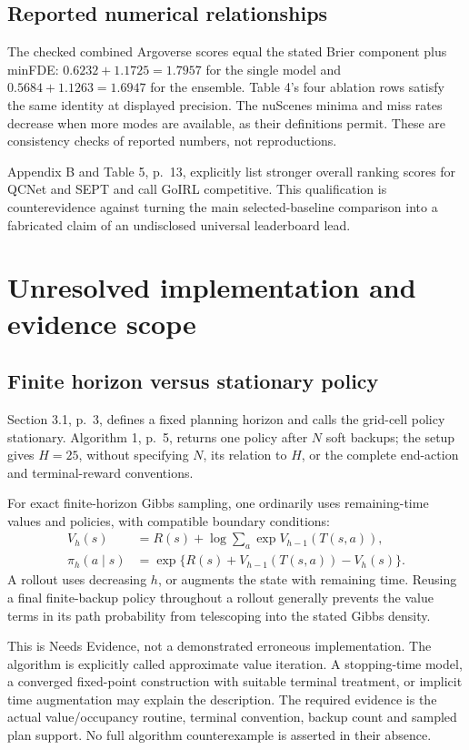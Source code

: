 \documentclass[10pt]{article}
\begin{document}
\subsection*{Reported numerical relationships}
The checked combined Argoverse scores equal the stated Brier component plus minFDE: \(0.6232+1.1725=1.7957\) for the single model and \(0.5684+1.1263=1.6947\) for the ensemble. Table 4’s four ablation rows satisfy the same identity at displayed precision. The nuScenes minima and miss rates decrease when more modes are available, as their definitions permit. These are consistency checks of reported numbers, not reproductions.\par
Appendix B and Table 5, p. 13, explicitly list stronger overall ranking scores for QCNet and SEPT and call GoIRL competitive. This qualification is counterevidence against turning the main selected-baseline comparison into a fabricated claim of an undisclosed universal leaderboard lead.\par
\section*{Unresolved implementation and evidence scope}
\subsection*{Finite horizon versus stationary policy}
Section 3.1, p. 3, defines a fixed planning horizon and calls the grid-cell policy stationary. Algorithm 1, p. 5, returns one policy after \(N\) soft backups; the setup gives \(H=25\), without specifying \(N\), its relation to \(H\), or the complete end-action and terminal-reward conventions.\par
For exact finite-horizon Gibbs sampling, one ordinarily uses remaining-time values and policies, with compatible boundary conditions: \[\begin{aligned}
 V_h(s)&=R(s)+\log\sum_a\exp V_{h-1}(T(s,a)),\\
 \pi_h(a\mid s)&=\exp\{R(s)+V_{h-1}(T(s,a))-V_h(s)\}.\end{aligned}\] A rollout uses decreasing \(h\), or augments the state with remaining time. Reusing a final finite-backup policy throughout a rollout generally prevents the value terms in its path probability from telescoping into the stated Gibbs density.\par
This is Needs Evidence, not a demonstrated erroneous implementation. The algorithm is explicitly called approximate value iteration. A stopping-time model, a converged fixed-point construction with suitable terminal treatment, or implicit time augmentation may explain the description. The required evidence is the actual value/occupancy routine, terminal convention, backup count and sampled plan support. No full algorithm counterexample is asserted in their absence.\par
\end{document}
